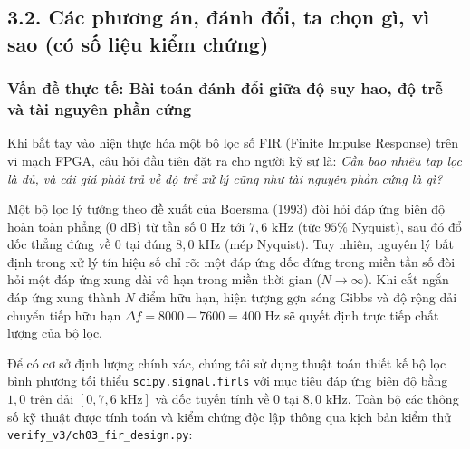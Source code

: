 \subsection*{3.2. Các phương án, đánh đổi, ta chọn gì, vì sao (có số liệu kiểm chứng)}

\subsubsection*{Vấn đề thực tế: Bài toán đánh đổi giữa độ suy hao, độ trễ và tài nguyên phần cứng}
Khi bắt tay vào hiện thực hóa một bộ lọc số FIR (Finite Impulse Response) trên vi mạch FPGA, câu hỏi đầu tiên đặt ra cho người kỹ sư là: \emph{Cần bao nhiêu tap lọc là đủ, và cái giá phải trả về độ trễ xử lý cũng như tài nguyên phần cứng là gì?}

Một bộ lọc lý tưởng theo đề xuất của Boersma (1993) đòi hỏi đáp ứng biên độ hoàn toàn phẳng ($0\text{ dB}$) từ tần số $0\text{ Hz}$ tới $7{,}6\text{ kHz}$ (tức $95\%$ Nyquist), sau đó đổ dốc thẳng đứng về $0$ tại đúng $8{,}0\text{ kHz}$ (mép Nyquist). Tuy nhiên, nguyên lý bất định trong xử lý tín hiệu số chỉ rõ: một đáp ứng dốc đứng trong miền tần số đòi hỏi một đáp ứng xung dài vô hạn trong miền thời gian ($N \to \infty$). Khi cắt ngắn đáp ứng xung thành $N$ điểm hữu hạn, hiện tượng gợn sóng Gibbs và độ rộng dải chuyển tiếp hữu hạn $\Delta f = 8000 - 7600 = 400\text{ Hz}$ sẽ quyết định trực tiếp chất lượng của bộ lọc.

Để có cơ sở định lượng chính xác, chúng tôi sử dụng thuật toán thiết kế bộ lọc bình phương tối thiểu \texttt{scipy.signal.firls} với mục tiêu đáp ứng biên độ bằng $1{,}0$ trên dải $[0, 7{,}6\text{ kHz}]$ và dốc tuyến tính về $0$ tại $8{,}0\text{ kHz}$. Toàn bộ các thông số kỹ thuật được tính toán và kiểm chứng độc lập thông qua kịch bản kiểm thử \texttt{verify\_v3/ch03\_fir\_design.py}:

